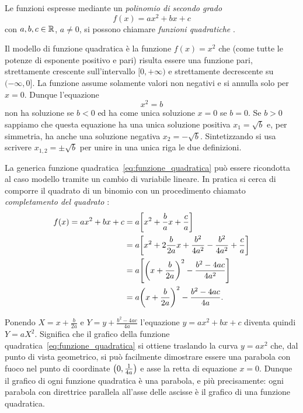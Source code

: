 Le funzioni espresse mediante un \emph{polinomio di secondo grado}%
%
\begin{equation}\label{eq:funzione_quadratica}
  f(x) = ax^2 + bx +c
\end{equation}
con $a,b,c\in {\mathbb R}$, $a\neq 0$, si possono chiamare
\emph{funzioni quadratiche}%
%
.

Il modello di funzione quadratica è la funzione
$f(x) = x^2$ che (come tutte le potenze di esponente positivo e pari)
risulta essere una funzione pari, strettamente crescente
sull'intervallo $[0,+\infty)$ e strettamente decrescente
su $(-\infty,0]$. La funzione assume solamente valori non negativi
e si annulla solo per $x=0$.
Dunque l'equazione
\[
  x^2 = b
\]
non ha soluzione se $b<0$ ed ha come unica soluzione $x=0$ se $b=0$.
Se $b>0$ sappiamo che
questa equazione ha una unica soluzione positiva $x_1 = \sqrt{b}$
e, per simmetria, ha anche una soluzione negativa $x_2 = -\sqrt{b}$.
Sintetizzando si usa scrivere $x_{1,2} = \pm \sqrt{b}$
per unire in una unica riga le due definizioni.

La generica funzione quadratica~\eqref{eq:funzione_quadratica}
può essere ricondotta al caso modello tramite un cambio
di variabile lineare. In pratica si cerca di comporre il quadrato
di un binomio con un procedimento chiamato
\emph{completamento del quadrato}%
%
:
\begin{equation}\label{eq:24589}
\begin{aligned}
f(x) = ax^2+bx+c
  &= a {\left[ x^2+\frac b a x + \frac c a \right]}\\
  &= a {\left[ x^2+2 \frac{b}{2a} x + \frac{b^2}{4a^2} - \frac{b^2}{4a^2} + \frac c a \right]}\\
  &= a {\left[ {\left( x+\frac{b}{2a} \right)}^2 - \frac{b^2-4ac}{4a^2} \right]} \\
  &= a{\left( x+\frac b{2a} \right)}^2  - \frac{b^2-4ac}{4a}.
\end{aligned}
\end{equation}

Ponendo $X=x+\frac b{2a}$ e $Y=y+\frac{b^2-4ac}{4a}$
l'equazione $y=ax^2+bx+c$ diventa quindi $Y=aX^2$. 
Significa
che il grafico della funzione quadratica~\eqref{eq:funzione_quadratica}
si ottiene traslando la curva $y = a x^2$ che, 
dal punto di vista geometrico, si può facilmente
dimostrare essere una parabola con fuoco
nel punto di coordinate ${\left( 0,\frac 1 {4a} \right)}$
e asse la retta di equazione $x=0$.
Dunque il grafico di ogni funzione quadratica è una parabola, 
e più precisamente: ogni parabola con direttrice parallela all'asse delle
ascisse è il grafico di una funzione quadratica.

